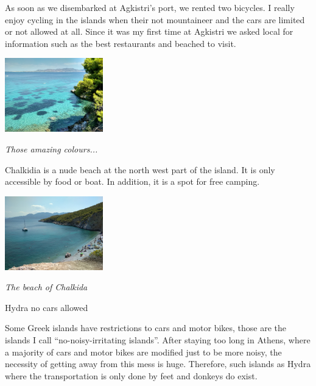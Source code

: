 \documentclass[10pt,a4paper]{article} %
\newcommand{\NewsItem}[1]{ %
\usefont{T1}{fvs}{n}{n} %
\vspace{24pt}\large #1\vspace{3pt} %
\par \normalsize \normalfont}
\begin{document}
\begin{multicols}{3}
As soon as we disembarked at Agkistri's port, we rented two bicycles. 
I really enjoy cycling in the islands when their not mountaineer and the cars 
are limited or not allowed at all.  
Since it was my first time at Agkistri we asked local for information such as 
the best restaurants and beached to visit. 

\begin{center}
	\includegraphics[width=0.32\textwidth]{tmp/agkistri_beach}
	\par\textit{Those amazing colours...}
\end{center}


Chalkidia is a nude beach at the north west part of the island. 
It is only accessible by food or boat. 
In addition, it is a spot for free camping.

\begin{center}
	\includegraphics[width=0.32\textwidth]{tmp/chalkida_beach}
	\par\textit{The beach of Chalkida}
\end{center}


\NewsItem{Hydra no cars allowed}


Some Greek islands have restrictions to cars and motor bikes, those are the islands 
I call ``no-noisy-irritating islands''. 
After staying too long in Athens, where a majority of cars and motor bikes are modified 
just to be more noisy, the necessity of getting away from this mess is huge. 
Therefore, such islands as Hydra where the transportation is only done by feet and 
donkeys do exist. 



\end{multicols}
\end{document}
